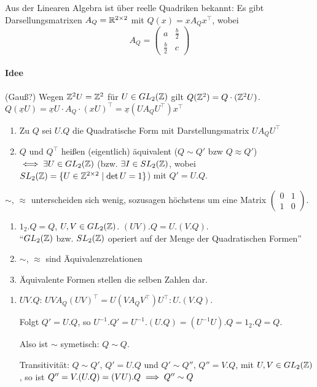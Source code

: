 \documentclass[a4paper,DIV15,BCOR12mm]{article}
\begin{document}
Aus der Linearen Algebra ist über reelle Quadriken bekannt: Es gibt Darsellungsmatrixen $A_Q = \mathbb{R}^{2\times 2}$ mit $Q(x) = xA_Q x^\top$, wobei 
\[ A_Q = \begin{pmatrix} a & \frac b 2 \\ \frac b 2 & c \end{pmatrix}\]

\paragraph{Idee} (Gauß?) Wegen $\mathbb{Z}^2 U = \mathbb{Z}^2$ für $U\in GL_2(\mathbb{Z})$ gilt $Q(\mathbb{Z}^2) = Q\cdot (\mathbb{Z}^2 U)$. $Q(\underline xU) = \underline xU \cdot A_Q \cdot (x U)^\top = \underline x (U A_Q U^\top) x^\top$

\begin{definition}
\begin{enumerate}
\item Zu $Q$ sei $U.Q$ die Quadratische Form mit Darstellungsmatrix $UA_QU^\top$
\item $Q$ und $Q^\top$ heißen (eigentlich) äquivalent ($Q \sim Q'$ bzw $Q \approx Q'$) $\iff \exists U\in GL_2(\mathbb{Z})$ (bzw. $\exists I \in SL_2(\mathbb{Z})$, wobei $SL_2(\mathbb{Z}) = \{ U\in\mathbb{Z}^{2\times 2}\mid \det U = 1\}$) mit $Q' = U.Q$.
\end{enumerate}
\end{definition}

$\sim$, $\approx$ unterscheiden sich wenig, sozusagen höchstens um eine Matrix $\begin{pmatrix} 0 & 1 \\ 1 & 0\end{pmatrix}$.

\begin{bemerkung}
\begin{enumerate}
\item $1_2.Q = Q$, $U,V \in GL_2(\mathbb{Z})$. $(UV).Q = U.(V.Q)$.\\
"`$GL_2(\mathbb{Z})$ bzw. $SL_2(\mathbb{Z})$ operiert auf der Menge der Quadratischen Formen"'
\item $\sim$, $\approx$ sind Äquivalenzrelationen
\item Äquivalente Formen stellen die selben Zahlen dar.
\end{enumerate}
\end{bemerkung}

\begin{beweis}
\begin{enumerate}
\item $UV.Q$: $UVA_Q(UV)^\top = U(VA_QV^\top)U^\top: U.(V.Q)$.

Folgt $Q'=U.Q$, so $U^{-1}.Q' = U^{-1}.(U.Q)=(U^{-1}U).Q = 1_2. Q =Q$.

Also ist $\sim$ symetisch: $Q\sim Q$.

Transitivität: $Q\sim Q'$, $Q'=U.Q$ und $Q'\sim Q''$, $Q'' = V.Q$, mit $U,V\in GL_2(\mathbb{Z})$, so ist $Q''=V.(U.Q)=(VU).Q \implies Q''\sim Q$
\end{enumerate}
\end{beweis}
\end{document}
